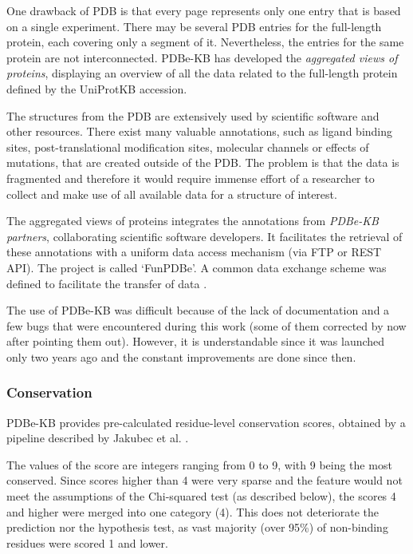 One drawback of PDB is that every page represents only one entry that is based on a single experiment. There may be several PDB entries for the full-length protein, each covering only a segment of it. Nevertheless, the entries for the same protein are not interconnected. PDBe-KB has developed the \textit{aggregated views of proteins}, displaying an overview of all the data related to the full-length protein defined by the UniProtKB accession.

The structures from the PDB are extensively used by scientific software and other resources. There exist many valuable annotations, such as ligand binding sites, post-translational modification sites, molecular channels or effects of mutations, that are created outside of the PDB. The problem is that the data is fragmented and therefore it would require immense effort of a researcher to collect and make use of all available data for a structure of interest.

The aggregated views of proteins integrates the annotations from \textit{PDBe-KB partners}, collaborating scientific software developers. It facilitates the retrieval of these annotations with a uniform data access mechanism (via FTP or REST API). The project is called `FunPDBe'. A common data exchange scheme was defined to facilitate the transfer of data \cite{pdbekb}.

The use of PDBe-KB was difficult because of the lack of documentation and a few bugs that were encountered during this work (some of them corrected by now after pointing them out). However, it is understandable since it was launched only two years ago and the constant improvements are done since then.

\subsubsection{Conservation}
PDBe-KB provides pre-calculated residue-level conservation scores, obtained by a pipeline described by Jakubec et al. \cite{3dpatch}.

The values of the score are integers ranging from 0 to 9, with 9 being the most conserved. Since scores higher than 4 were very sparse and the feature would not meet the assumptions of the Chi-squared test (as described below), the scores 4 and higher were merged into one category (4). This does not deteriorate the prediction nor the hypothesis test, as vast majority (over 95\%) of non-binding residues were scored 1 and lower.

